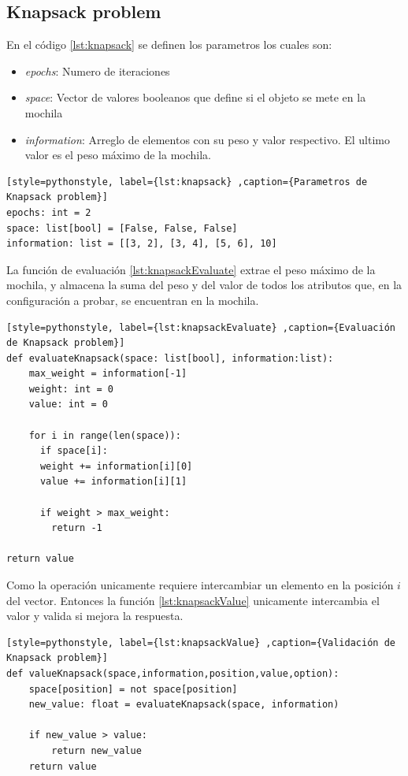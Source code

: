 \documentclass[12pt,twoside]{article}
\begin{document}
\clearpage
\subsection{Knapsack problem}

En el código \ref{lst:knapsack} se definen los parametros los cuales son:
\begin{itemize}
	\item \textit{epochs}: Numero de iteraciones
	\item \textit{space}: Vector de valores booleanos que define si el objeto se mete en la mochila
	\item \textit{information}: Arreglo de elementos con su peso y valor respectivo. El ultimo valor es el peso máximo de la mochila.  
\end{itemize}

\begin{lstlisting}[style=pythonstyle, label={lst:knapsack} ,caption={Parametros de Knapsack problem}]
epochs: int = 2
space: list[bool] = [False, False, False]
information: list = [[3, 2], [3, 4], [5, 6], 10]
\end{lstlisting}

La función de evaluación \ref{lst:knapsackEvaluate} extrae el peso máximo de la mochila, y almacena la suma del peso y del valor de todos los atributos que, en la configuración a probar, se encuentran en la mochila. 

\begin{lstlisting}[style=pythonstyle, label={lst:knapsackEvaluate} ,caption={Evaluación de Knapsack problem}]
def evaluateKnapsack(space: list[bool], information:list):
	max_weight = information[-1]
	weight: int = 0
	value: int = 0
	
	for i in range(len(space)):
	  if space[i]:
	  weight += information[i][0]
	  value += information[i][1]
	
	  if weight > max_weight:
	    return -1
	
return value
\end{lstlisting}

Como la operación   unicamente requiere intercambiar un elemento en la posición $i$ del vector. Entonces la función \ref{lst:knapsackValue} unicamente intercambia el valor y valida si mejora la respuesta. 

\begin{lstlisting}[style=pythonstyle, label={lst:knapsackValue} ,caption={Validación de Knapsack problem}]
def valueKnapsack(space,information,position,value,option):
	space[position] = not space[position]
	new_value: float = evaluateKnapsack(space, information)
	
	if new_value > value:
		return new_value
	return value
\end{lstlisting}
\end{document}
